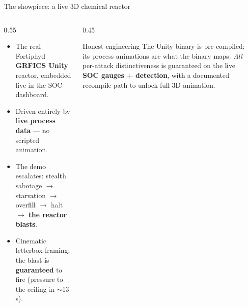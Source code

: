 \documentclass[aspectratio=169,11pt]{beamer}
\newcommand{\hl}[1]{{\color{accent}\textbf{#1}}}
\begin{document}
\begin{frame}{The showpiece: a live 3D chemical reactor}
\begin{columns}[T]
\begin{column}{0.55\textwidth}
\begin{itemize}\small
  \item The real Fortiphyd \hl{GRFICS Unity} reactor, embedded live in the SOC dashboard.
  \item Driven entirely by \hl{live process data} --- no scripted animation.
  \item The demo escalates: stealth sabotage $\rightarrow$ starvation $\rightarrow$ overfill $\rightarrow$ halt $\rightarrow$ \hl{the reactor blasts}.
  \item Cinematic letterbox framing; the blast is \hl{guaranteed} to fire (pressure to the ceiling in $\sim$13\,s).
\end{itemize}
\end{column}
\begin{column}{0.45\textwidth}
\begin{block}{Honest engineering}
\small The Unity binary is pre-compiled; its process animations are what the binary maps. \emph{All}
per-attack distinctiveness is guaranteed on the live \hl{SOC gauges + detection}, with a documented
recompile path to unlock full 3D animation.
\end{block}
\end{column}
\end{columns}
\end{frame}
\end{document}
